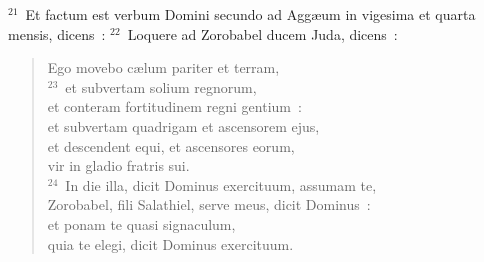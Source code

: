 ${}^{21}$~Et factum est verbum Domini secundo ad Agg\ae um in vigesima et quarta mensis, dicens~:
${}^{22}$~Loquere ad Zorobabel ducem Juda, dicens~: \begin{verse}Ego movebo c\ae lum pariter et terram,\\
${}^{23}$~et subvertam solium regnorum,\\ et conteram fortitudinem regni gentium~:\\ et subvertam quadrigam et ascensorem ejus,\\ et descendent equi, et ascensores eorum,\\ vir in gladio fratris sui.\\
${}^{24}$~In die illa, dicit Dominus exercituum, assumam te,\\ Zorobabel, fili Salathiel, serve meus, dicit Dominus~:\\ et ponam te quasi signaculum,\\ quia te elegi, dicit Dominus exercituum.\end{verse}



